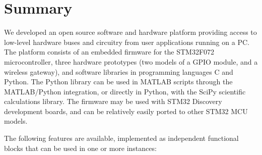 \chapter{Summary}

We developed an open source software and hardware platform providing access to low-level hardware buses and circuitry from user applications running on a \gls{PC}. The platform consists of an embedded firmware for the STM32F072 microcontroller, three hardware prototypes (two models of a \gls{GPIO} module, and a wireless gateway), and software libraries in programming languages C and Python. The Python library can be used in MATLAB scripts through the MATLAB/Python integration, or directly in Python, with the SciPy scientific calculations library. The firmware may be used with STM32 Discovery development boards, and can be relatively easily ported to other STM32 \gls{MCU} models.

\noindent
The following features are available, implemented as independent functional blocks that can be used in one or more instances: 


